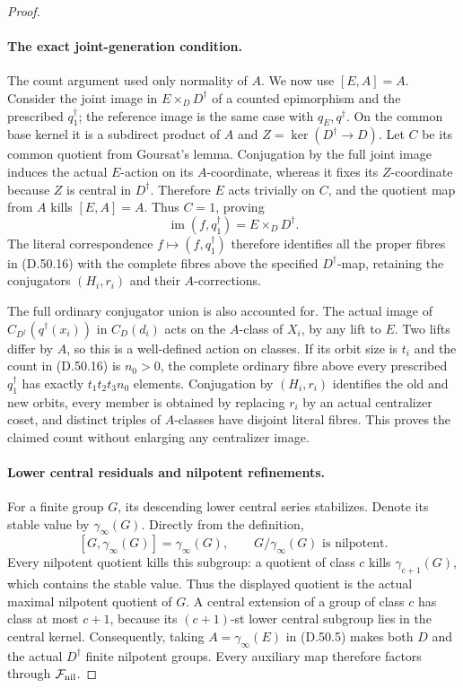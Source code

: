 \begin{proof}
\paragraph{The exact joint-generation condition.}
The count argument used only normality of \(A\). We now use
\([E,A]=A\). Consider the joint image in
\(E\times_DD^\dagger\) of a counted epimorphism and the
prescribed \(q_1^\dagger\); the reference image is the same
case with \(q_E,q^\dagger\).
On the common base kernel it is a subdirect product of
\(A\) and \(Z=\ker(D^\dagger\to D)\).
Let \(C\) be its common quotient from Goursat's lemma.
Conjugation by the full joint image induces the actual
\(E\)-action on its \(A\)-coordinate, whereas it fixes its
\(Z\)-coordinate because \(Z\) is central in \(D^\dagger\).
Therefore \(E\) acts trivially on \(C\), and the quotient
map from \(A\) kills \([E,A]=A\). Thus \(C=1\), proving
\[
 \operatorname{im}(f,q_1^\dagger)
                        =E\times_DD^\dagger.
 \tag{D.50.17}
\]
The literal correspondence \(f\mapsto(f,q_1^\dagger)\)
therefore identifies all the proper fibres in
\textup{(D.50.16)} with the complete fibres above the
specified \(D^\dagger\)-map, retaining the conjugators
\((H_i,r_i)\) and their \(A\)-corrections.

The full ordinary conjugator union is also accounted for.
The actual image of
\(C_{D^\dagger}(q^\dagger(x_i))\) in \(C_D(d_i)\) acts
on the \(A\)-class of \(X_i\), by any lift to \(E\).
Two lifts differ by \(A\), so this is a well-defined
action on classes. If its orbit size is \(t_i\) and
the count in \textup{(D.50.16)} is \(n_0>0\), the complete
ordinary fibre above every prescribed \(q_1^\dagger\)
has exactly \(t_1t_2t_3n_0\) elements.
Conjugation by \((H_i,r_i)\) identifies the old and new
orbits, every member is obtained by replacing \(r_i\)
by an actual centralizer coset, and distinct triples of
\(A\)-classes have disjoint literal fibres. This proves
the claimed count without enlarging any centralizer image.

\paragraph{Lower central residuals and nilpotent refinements.}
For a finite group \(G\), its descending lower central
series stabilizes. Denote its stable value by
\(\gamma_\infty(G)\). Directly from the definition,
\[
 [G,\gamma_\infty(G)]=\gamma_\infty(G),\qquad
 G/\gamma_\infty(G)\text{ is nilpotent}.
 \tag{D.50.18}
\]
Every nilpotent quotient kills this subgroup: a quotient
of class \(c\) kills \(\gamma_{c+1}(G)\), which contains
the stable value. Thus the displayed quotient is the
actual maximal nilpotent quotient of \(G\).
A central extension of a group of class \(c\) has class
at most \(c+1\), because its \((c+1)\)-st lower central
subgroup lies in the central kernel. Consequently, taking
\(A=\gamma_\infty(E)\) in \textup{(D.50.5)} makes both
\(D\) and the actual \(D^\dagger\) finite nilpotent groups.
Every auxiliary map therefore factors through
\(\mathcal F_{\rm nil}\).


\end{proof}
